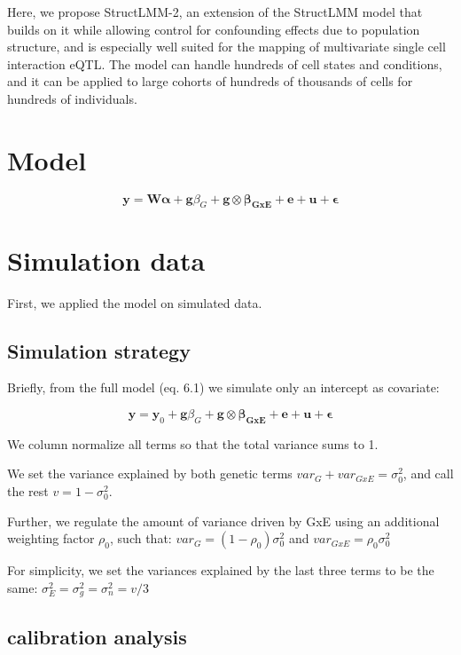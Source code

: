 Here, we propose StructLMM-2, an extension of the StructLMM model that builds on it while allowing control for confounding effects due to population structure, and is especially well suited for the mapping of multivariate single cell interaction eQTL. 
The model can handle hundreds of cell states and conditions, and it can be applied to large cohorts of hundreds of thousands of cells for hundreds of  individuals.


\section{Model} 

\begin{equation}
 \mathbf{y} =  \mathbf{W}\boldsymbol{\alpha} + \mathbf{g}\beta_G + \mathbf{g} \otimes \boldsymbol{\beta_{GxE}} + \mathbf{e} + \mathbf{u} + \boldsymbol{\epsilon} 
\end{equation}

\section{Simulation data}

First, we applied the model on simulated data.

\subsection{Simulation strategy}
Briefly, from the full model (eq. 6.1) we simulate only an intercept as covariate:  

\begin{equation}
 \mathbf{y} = \mathbf{y}_0 + \mathbf{g}\beta_G + \mathbf{g} \otimes \boldsymbol{\beta_{GxE}} + \mathbf{e} + \mathbf{u} + \boldsymbol{\epsilon} 
\end{equation}

We column normalize all terms so that the total variance sums to 1.

We set the variance explained by both genetic terms $var_G+var_{GxE}=\sigma_0^2$, and call the rest $v = 1-\sigma_0^2$.

Further, we regulate the amount of variance driven by GxE using an additional weighting factor $\rho_0$, such that: $var_G = (1-\rho_0)\sigma_0^2$ and $var_{GxE} = \rho_0\sigma_0^2$

For simplicity, we set the variances explained by the last three terms to be the same:
$\sigma_E^2 = \sigma_g^2 = \sigma_n^2 = v/3$

\subsection{calibration analysis}

